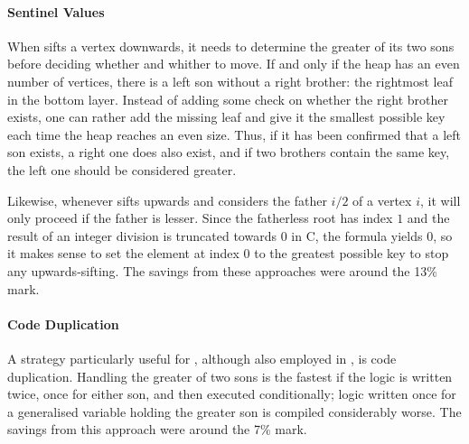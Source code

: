 \paragraph{Sentinel Values}
When \HS{} sifts a vertex downwards, it needs to determine the greater of its two sons before deciding whether and whither to move.
If and only if the heap has an even number of vertices, there is a left son without a right brother:
the rightmost leaf in the bottom layer.
Instead of adding some check on whether the right brother exists, one can rather add the missing leaf and give it the smallest possible key each time the heap reaches an even size.
Thus, if it has been confirmed that a left son exists, a right one does also exist, and if two brothers contain the same key, the left one should be considered greater.

Likewise, whenever \HS{} sifts upwards and considers the father \(i/2\) of a vertex \(i\), it will only proceed if the father is lesser.
Since the fatherless root has index \(1\) and the result of an integer division is truncated towards \(0\) in C, the formula yields \(0\), so it makes sense to set the element at index \(0\) to the greatest possible key to stop any upwards-sifting.
The savings from these approaches were around the 13\% mark.

\paragraph{Code Duplication}
A strategy particularly useful for \HS{}, although also employed in \MS{}, is code duplication.
Handling the greater of two sons is the fastest if the logic is written twice, once for either son, and then executed conditionally;
logic written once for a generalised variable holding the greater son is compiled considerably worse.
The savings from this approach were around the 7\% mark.





